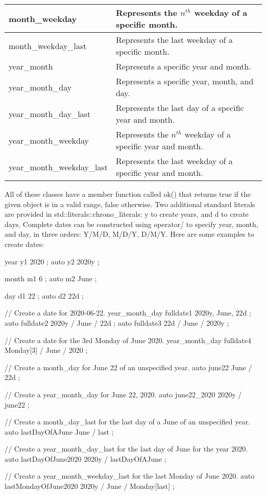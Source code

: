 \begin{longtable}{|l|l|}
month\_weekday &
Represents the $n^{th}$ weekday of a specific month. \\ \hline
month\_weekday\_last &
Represents the last weekday of a specific month. \\ \hline
year\_month &
Represents a specific year and month. \\ \hline
year\_month\_day &
Represents a specific year, month, and day. \\ \hline
year\_month\_day\_last &
Represents the last day of a specific year and month. \\ \hline
year\_month\_weekday &
Represents the $n^{th}$ weekday of a specific year and month. \\ \hline
year\_month\_weekday\_last &
Represents the last weekday of a specific year and month. \\ \hline
\end{longtable}

All of these classes have a member function called ok() that returns true if the given object is in a valid range, false otherwise. Two additional standard literals are provided in std::literals::chrono\_literals: y to create years, and d to create days. Complete dates can be constructed using operator/ to specify year, month, and day, in three orders: Y/M/D, M/D/Y, D/M/Y. Here are some examples to create dates:

\begin{cpp}
year y1 { 2020 };
auto y2 { 2020y };

month m1 { 6 };
auto m2 { June };

day d1 { 22 };
auto d2 { 22d };

// Create a date for 2020-06-22.
year_month_day fulldate1 { 2020y, June, 22d };
auto fulldate2 { 2020y / June / 22d };
auto fulldate3 { 22d / June / 2020y };

// Create a date for the 3rd Monday of June 2020.
year_month_day fulldate4 { Monday[3] / June / 2020 };

// Create a month_day for June 22 of an unspecified year.
auto june22 { June / 22d };

// Create a year_month_day for June 22, 2020.
auto june22_2020 { 2020y / june22 };

// Create a month_day_last for the last day of a June of an unspecified year.
auto lastDayOfAJune { June / last };

// Create a year_month_day_last for the last day of June for the year 2020.
auto lastDayOfJune2020 { 2020y / lastDayOfAJune };

// Create a year_month_weekday_last for the last Monday of June 2020.
auto lastMondayOfJune2020 { 2020y / June / Monday[last] };
\end{cpp}

